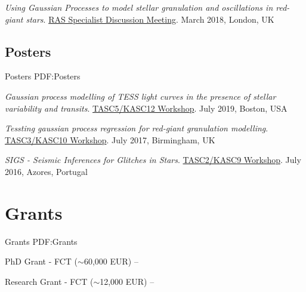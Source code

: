 \documentclass[letterpaper,10pt,oneside]{article}
\begin{document}
\begin{body}
\GapNoBreak

\BulletItem
\emph{Using Gaussian Processes to model stellar granulation and oscillations in red-giant stars}. \newline
\href{https://sites.google.com/view/ras-evolsystems/home}{RAS Specialist Discussion Meeting}. March 2018, London, UK


\BigGap
\subsection
{Posters}
{Posters}
{PDF:Posters}

\BulletItem
\emph{Gaussian process modelling of TESS light curves in the presence of stellar variability and transits}. \newline
\href{https://web.mit.edu/tasc5/}{TASC5/KASC12 Workshop}. July 2019, Boston, USA

\GapNoBreak

\BulletItem
\emph{Tessting gaussian process regression for red-giant granulation modelling}. \newline
\href{https://www.tasc3kasc10.com/}{TASC3/KASC10 Workshop}. July 2017, Birmingham, UK

\GapNoBreak

\BulletItem
\emph{SIGS - Seismic Inferences for Glitches in Stars}. \newline
\href{http://www.iastro.pt/research/conferences/spacetk16/}{TASC2/KASC9 Workshop}. July 2016, Azores, Portugal

    




\section
{Grants}
{Grants}
{PDF:Grants}

\BulletItem
PhD Grant - FCT ($\sim$60,000 EUR) \hfill 
{} -- 

\GapNoBreak
\BulletItem
Research Grant - FCT ($\sim$12,000 EUR) \hfill 
{} -- 


\end{body}
\end{document}
